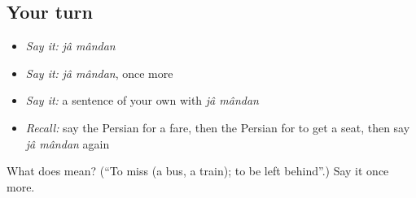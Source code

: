 \subsection*{Your turn}
\begin{itemize}
\raggedright
  \item \emph{Say it:} \emph{jâ mândan}
  \item \emph{Say it:} \emph{jâ mândan}, once more
  \item \emph{Say it:} a sentence of your own with \emph{jâ mândan}
  \item \emph{Recall:} say the Persian for a fare, then the Persian for to get a seat, then say \emph{jâ mândan} again
\end{itemize}

\begin{tcolorbox}[breakable,colback=teal!4,colframe=teal!35!black,title={Before you move on}]
What does   mean? (\textquotedblleft{}To miss (a bus, a train); to be left behind\textquotedblright{}.) Say it once more.
\end{tcolorbox}

